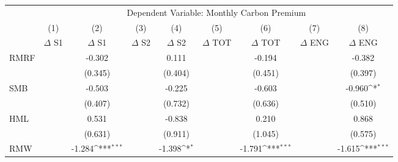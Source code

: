 {
\def\sym#1{\ifmmode^{#1}\else\(^{#1}\)\fi}
\begin{tabular}{l*{8}{c}}
\hline\hline
                    &\multicolumn{8}{c}{Dependent Variable: Monthly Carbon Premium}                                                                                                                 \\\cmidrule(lr){2-9}
                    &\multicolumn{1}{c}{(1)}&\multicolumn{1}{c}{(2)}&\multicolumn{1}{c}{(3)}&\multicolumn{1}{c}{(4)}&\multicolumn{1}{c}{(5)}&\multicolumn{1}{c}{(6)}&\multicolumn{1}{c}{(7)}&\multicolumn{1}{c}{(8)}\\
                    &\multicolumn{1}{c}{$\Delta$ S1}&\multicolumn{1}{c}{$\Delta$ S1}&\multicolumn{1}{c}{$\Delta$ S2}&\multicolumn{1}{c}{$\Delta$ S2}&\multicolumn{1}{c}{$\Delta$ TOT}&\multicolumn{1}{c}{$\Delta$ TOT}&\multicolumn{1}{c}{$\Delta$ ENG}&\multicolumn{1}{c}{$\Delta$ ENG}\\
\hline
RMRF                &                     &      -0.302         &                     &       0.111         &                     &      -0.194         &                     &      -0.382         \\
                    &                     &     (0.345)         &                     &     (0.404)         &                     &     (0.451)         &                     &     (0.397)         \\
SMB                 &                     &      -0.503         &                     &      -0.225         &                     &      -0.603         &                     &      -0.960\sym{*}  \\
                    &                     &     (0.407)         &                     &     (0.732)         &                     &     (0.636)         &                     &     (0.510)         \\
HML                 &                     &       0.531         &                     &      -0.838         &                     &       0.210         &                     &       0.868         \\
                    &                     &     (0.631)         &                     &     (0.911)         &                     &     (1.045)         &                     &     (0.575)         \\
RMW                 &                     &      -1.284\sym{***}&                     &      -1.398\sym{*}  &                     &      -1.791\sym{***}&                     &      -1.615\sym{***}\\

\end{tabular}}
